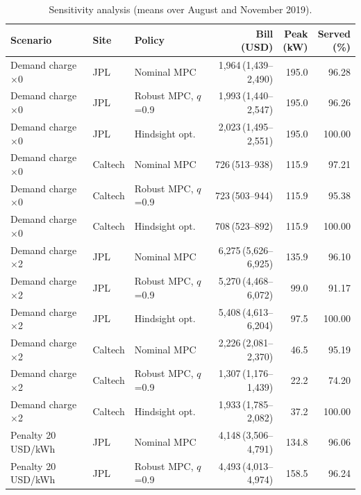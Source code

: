 \begin{table}[!htbp]
\centering
\caption{Sensitivity analysis (means over August and November 2019).}
\label{tab:sens}
\footnotesize
\setlength{\tabcolsep}{1.5pt}
\begin{tabular*}{\textwidth}{@{\extracolsep{\fill}}lllrrr@{}}
\hline
Scenario & Site & Policy & \makecell[c]{Bill\\(USD)} & \makecell[c]{Peak\\(kW)} & \makecell[c]{Served\\(\%)} \\
\hline
Demand charge $\times$0 & JPL & Nominal MPC & 1,964\,{\scriptsize(1,439--2,490)} & 195.0 & 96.28 \\
Demand charge $\times$0 & JPL & Robust MPC, $q$=0.9 & 1,993\,{\scriptsize(1,440--2,547)} & 195.0 & 96.26 \\
Demand charge $\times$0 & JPL & Hindsight opt. & 2,023\,{\scriptsize(1,495--2,551)} & 195.0 & 100.00 \\
Demand charge $\times$0 & Caltech & Nominal MPC & 726\,{\scriptsize(513--938)} & 115.9 & 97.21 \\
Demand charge $\times$0 & Caltech & Robust MPC, $q$=0.9 & 723\,{\scriptsize(503--944)} & 115.9 & 95.38 \\
Demand charge $\times$0 & Caltech & Hindsight opt. & 708\,{\scriptsize(523--892)} & 115.9 & 100.00 \\
\hline
Demand charge $\times$2 & JPL & Nominal MPC & 6,275\,{\scriptsize(5,626--6,925)} & 135.9 & 96.10 \\
Demand charge $\times$2 & JPL & Robust MPC, $q$=0.9 & 5,270\,{\scriptsize(4,468--6,072)} & 99.0 & 91.17 \\
Demand charge $\times$2 & JPL & Hindsight opt. & 5,408\,{\scriptsize(4,613--6,204)} & 97.5 & 100.00 \\
Demand charge $\times$2 & Caltech & Nominal MPC & 2,226\,{\scriptsize(2,081--2,370)} & 46.5 & 95.19 \\
Demand charge $\times$2 & Caltech & Robust MPC, $q$=0.9 & 1,307\,{\scriptsize(1,176--1,439)} & 22.2 & 74.20 \\
Demand charge $\times$2 & Caltech & Hindsight opt. & 1,933\,{\scriptsize(1,785--2,082)} & 37.2 & 100.00 \\
\hline
Penalty 20\,USD/kWh & JPL & Nominal MPC & 4,148\,{\scriptsize(3,506--4,791)} & 134.8 & 96.06 \\
Penalty 20\,USD/kWh & JPL & Robust MPC, $q$=0.9 & 4,493\,{\scriptsize(4,013--4,974)} & 158.5 & 96.24 \\

\end{tabular*}
\end{table}
